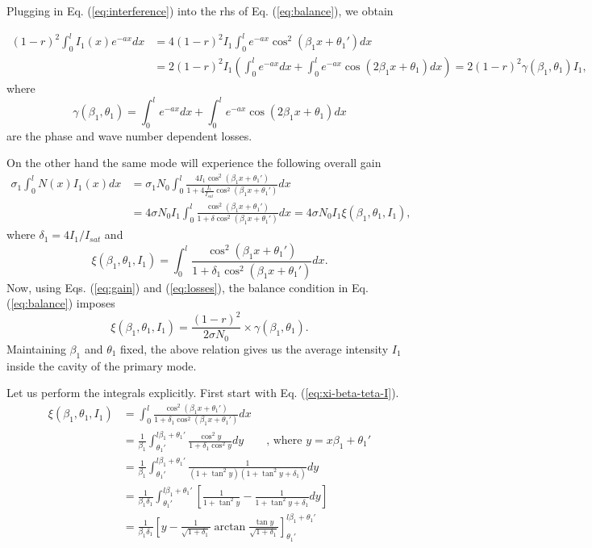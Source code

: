 \documentclass[preprint,secnumarabic,amssymb, nobibnotes, aip, prd]{revtex4-1}
\begin{document}
Plugging in Eq. (\ref{eq:interference}) into the rhs of Eq. (\ref{eq:balance}), we obtain 

\begin{align}
\label{eq:losses}
(1-r)^2\int_{0}^{l}I_1(x)e^{-ax}dx &= 4(1-r)^2I_1\int_{0}^{l}e^{-ax}\cos^2(\beta_1 x+\theta_1')dx \nonumber \\ 
&=  2(1-r)^2I_1\left(\int_{0}^{l}e^{-ax}dx + \int_{0}^{l}e^{-ax}\cos(2\beta_1 x+\theta_1)dx\right) = 2(1-r)^2\gamma(\beta_1,\theta_1) I_1,
\end{align}
where 
\begin{equation}
\label{eq:gamma-beta-teta}
\gamma(\beta_1,\theta_1) = \int_{0}^{l}e^{-ax}dx + \int_{0}^{l}e^{-ax}\cos(2\beta_1 x+\theta_1)dx
\end{equation}
are the phase and wave number dependent losses. 

On the other hand the same mode will experience the following overall gain
\begin{align}
\label{eq:gain}
\sigma_1\int_{0}^{l} N(x)I_1(x)dx &= \sigma_1 N_0 \int_{0}^{l}\frac{4I_1\cos^2(\beta_1 x+\theta_1')}{1+4\frac{I_1}{I_{sat}}\cos^2(\beta_1 x+\theta_1')}dx \nonumber \\ 
&= 4\sigma N_0I_1 \int_{0}^{l} \frac{\cos^2(\beta_1 x+\theta_1')}{1+\delta\cos^2(\beta_1 x+\theta_1')} dx  =4\sigma N_0 I_1 \xi(\beta_1,\theta_1,I_1),
\end{align}
where $\delta_1 = 4I_1/I_{sat}$ and
\begin{equation}
\label{eq:xi-beta-teta-I}
\xi(\beta_1,\theta_1,I_1) = \int_{0}^{l} \frac{\cos^2(\beta_1 x+\theta_1')}{1+\delta_1\cos^2(\beta_1 x+\theta_1')} dx.
\end{equation}
Now, using Eqs. (\ref{eq:gain}) and (\ref{eq:losses}), the balance condition in Eq. (\ref{eq:balance}) imposes 
\begin{equation}
\label{eq:balance-02}
\xi(\beta_1,\theta_1,I_1) = \frac{(1-r)^2}{2\sigma N_0} \times \gamma(\beta_1,\theta_1).
\end{equation}
Maintaining $\beta_1$ and $\theta_1$ fixed, the above relation gives us the average intensity $I_1$ inside the cavity of the primary mode. 

Let us perform the integrals explicitly. First start with Eq. (\ref{eq:xi-beta-teta-I}). 
\begin{align}
\label{eq:xi-beta-teta-I-sol}
	\xi(\beta_1,\theta_1,I_1) &= \int_{0}^{l} \frac{\cos^2(\beta_1 x+\theta_1')}{1+\delta_1\cos^2(\beta_1 x+\theta_1')} dx \nonumber \\
	 &=\frac{1}{\beta_1}\int_{\theta_1'}^{l\beta_1+\theta_1'} \frac{\cos^2y}{1+\delta_1\cos^2y} dy  \quad \quad \text{, where } y = x\beta_1+\theta_1' \nonumber \\
	 &= \frac{1}{\beta_1}\int_{\theta_1'}^{l\beta_1+\theta_1'} \frac{1}{(1+\tan^2y)(1+\tan^2y+\delta_1)} dy  \nonumber \\
	 &= \frac{1}{\beta_1\delta_1}\int_{\theta_1'}^{l\beta_1+\theta_1'} \left[\frac{1}{1+\tan^2y} - \frac{1}{1+\tan^2y+\delta_1} dy \right] \nonumber \\
	 &= \frac{1}{\beta_1\delta_1}\left[y - \frac{1}{\sqrt{1+\delta_1}} \arctan\frac{\tan y}{\sqrt{1+\delta_1}} \right]_{\theta_1'}^{l\beta_1+\theta_1'}
\end{align} 
\end{document}
